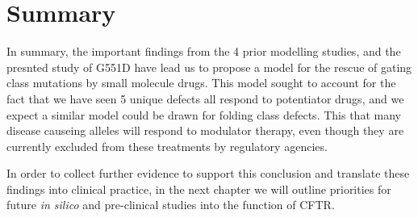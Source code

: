 

\section{Summary}
In summary, the important findings from the 4 prior modelling studies, and the presnted study of G551D have lead us to propose a model for the rescue of gating class mutations by small molecule drugs. This model sought to account for the fact that we have seen 5 unique defects all respond to potentiator drugs, and we expect a similar model could be drawn for folding class defects. This that many disease causeing alleles will respond to modulator therapy, even though they are currently excluded from these treatments by regulatory agencies. 

In order to collect further evidence to support this conclusion and translate these findings into clinical practice, in the next chapter we will outline priorities for future \textit{in silico} and pre-clinical studies into the function of CFTR.
